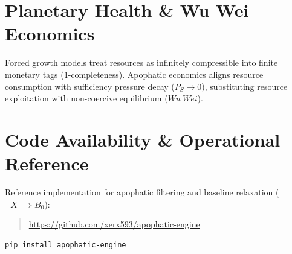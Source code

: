 \documentclass[master_monograph.tex]{subfiles}
\begin{document}
\section{Planetary Health \& Wu Wei Economics}
Forced growth models treat resources as infinitely compressible into finite monetary tags ($1$-completeness). Apophatic economics aligns resource consumption with sufficiency pressure decay ($P_S \to 0$), substituting resource exploitation with non-coercive equilibrium ($Wu\ W\acute{e}i$).

\section{Code Availability \& Operational Reference}
Reference implementation for apophatic filtering and baseline relaxation ($\neg X \implies B_0$):
\begin{quote}
\url{https://github.com/xerx593/apophatic-engine}
\end{quote}
\begin{verbatim}
pip install apophatic-engine
\end{verbatim}
\end{document}
